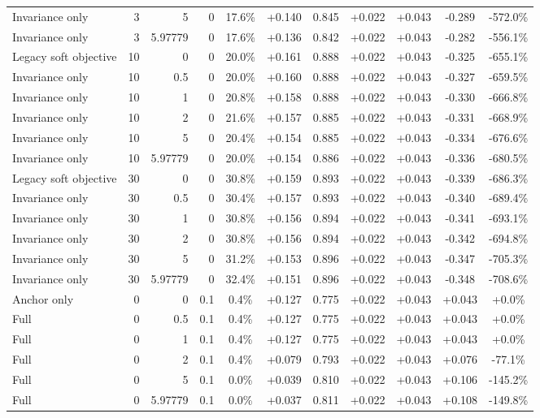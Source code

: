 \begin{table}[htbp]
\begin{tabular}{lrrrccccccc}
Invariance only & 3 & 5 & 0 & 17.6\% & +0.140 & 0.845 & +0.022 & +0.043 & -0.289 & -572.0\% \\
Invariance only & 3 & 5.97779 & 0 & 17.6\% & +0.136 & 0.842 & +0.022 & +0.043 & -0.282 & -556.1\% \\
Legacy soft objective & 10 & 0 & 0 & 20.0\% & +0.161 & 0.888 & +0.022 & +0.043 & -0.325 & -655.1\% \\
Invariance only & 10 & 0.5 & 0 & 20.0\% & +0.160 & 0.888 & +0.022 & +0.043 & -0.327 & -659.5\% \\
Invariance only & 10 & 1 & 0 & 20.8\% & +0.158 & 0.888 & +0.022 & +0.043 & -0.330 & -666.8\% \\
Invariance only & 10 & 2 & 0 & 21.6\% & +0.157 & 0.885 & +0.022 & +0.043 & -0.331 & -668.9\% \\
Invariance only & 10 & 5 & 0 & 20.4\% & +0.154 & 0.885 & +0.022 & +0.043 & -0.334 & -676.6\% \\
Invariance only & 10 & 5.97779 & 0 & 20.0\% & +0.154 & 0.886 & +0.022 & +0.043 & -0.336 & -680.5\% \\
Legacy soft objective & 30 & 0 & 0 & 30.8\% & +0.159 & 0.893 & +0.022 & +0.043 & -0.339 & -686.3\% \\
Invariance only & 30 & 0.5 & 0 & 30.4\% & +0.157 & 0.893 & +0.022 & +0.043 & -0.340 & -689.4\% \\
Invariance only & 30 & 1 & 0 & 30.8\% & +0.156 & 0.894 & +0.022 & +0.043 & -0.341 & -693.1\% \\
Invariance only & 30 & 2 & 0 & 30.8\% & +0.156 & 0.894 & +0.022 & +0.043 & -0.342 & -694.8\% \\
Invariance only & 30 & 5 & 0 & 31.2\% & +0.153 & 0.896 & +0.022 & +0.043 & -0.347 & -705.3\% \\
Invariance only & 30 & 5.97779 & 0 & 32.4\% & +0.151 & 0.896 & +0.022 & +0.043 & -0.348 & -708.6\% \\
Anchor only & 0 & 0 & 0.1 & 0.4\% & +0.127 & 0.775 & +0.022 & +0.043 & +0.043 & +0.0\% \\
Full & 0 & 0.5 & 0.1 & 0.4\% & +0.127 & 0.775 & +0.022 & +0.043 & +0.043 & +0.0\% \\
Full & 0 & 1 & 0.1 & 0.4\% & +0.127 & 0.775 & +0.022 & +0.043 & +0.043 & +0.0\% \\
Full & 0 & 2 & 0.1 & 0.4\% & +0.079 & 0.793 & +0.022 & +0.043 & +0.076 & -77.1\% \\
Full & 0 & 5 & 0.1 & 0.0\% & +0.039 & 0.810 & +0.022 & +0.043 & +0.106 & -145.2\% \\
Full & 0 & 5.97779 & 0.1 & 0.0\% & +0.037 & 0.811 & +0.022 & +0.043 & +0.108 & -149.8\% \\

\end{tabular}
\end{table}
